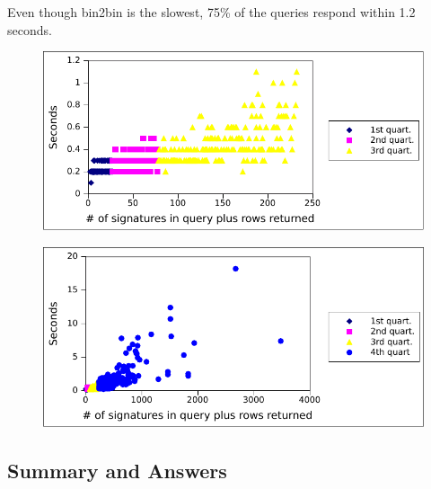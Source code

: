 Even though bin2bin is the slowest, 75\% of the queries
respond within 1.2 seconds.


\begin{figure}[h]
  \centering
\includegraphics[width=\columnwidth]{plots/performance-bin2bin-1st-3-quartiles.pdf}
  \label{fig:perfBin2Bin3quartiles}
\end{figure}


\begin{figure}[h]
  \centering
\includegraphics[width=\columnwidth]{plots/performance-bin2bin-all-4-quartiles.pdf}
  \label{fig:perfBin2Bin}
\end{figure}



\subsection{Summary and Answers}

